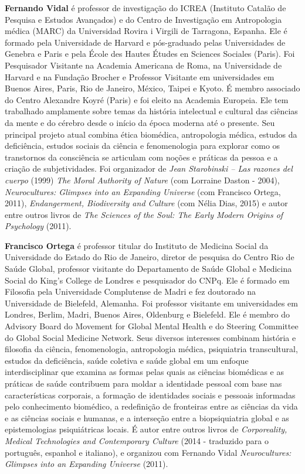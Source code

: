\textbf{Fernando Vidal} é professor de investigação do ICREA (Instituto
Catalão de Pesquisa e Estudos Avançados) e do Centro de Investigação em
Antropologia médica (MARC) da Universidad Rovira i Virgili de Tarragona,
Espanha. Ele é formado pela Universidade de Harvard e pós-graduado pelas
Universidades de Genebra e Paris e pela École des Hautes Études en
Sciences Sociales (Paris). Foi Pesquisador Visitante na Academia
Americana de Roma, na Universidade de Harvard e na Fundação Brocher e
Professor Visitante em universidades em Buenos Aires, Paris, Rio de
Janeiro, México, Taipei e Kyoto. É membro associado do Centro Alexandre
Koyré (Paris) e foi eleito na Academia Europeia. Ele tem trabalhado
amplamente sobre temas da história intelectual e cultural das ciências
da mente e do cérebro desde o início da época moderna até o presente.
Seu principal projeto atual combina ética biomédica, antropologia
médica, estudos da deficiência, estudos sociais da ciência e
fenomenologia para explorar como os transtornos da consciência se
articulam com noções e práticas da pessoa e a criação de subjetividades.
Foi organizador de \emph{Jean Starobinski -- Las razones del cuerpo}
(1999) \emph{The Moral Authority of Nature} (com Lorraine Daston -
2004), \emph{Neurocultures: Glimpses into an Expanding Universe }(com
Francisco Ortega, 2011), \emph{Endangerment, Biodiversity and
Culture} (com Nélia Dias, 2015) e autor entre outros livros de \emph{The
Sciences of the Soul: The Early Modern Origins of Psychology} (2011).

\textbf{Francisco Ortega} é professor titular do Instituto de Medicina
Social da Universidade do Estado do Rio de Janeiro, diretor de pesquisa
do Centro Rio de Saúde Global, professor visitante do Departamento de
Saúde Global e Medicina Social do King's College de Londres e
pesquisador do CNPq. Ele é formado em Filosofia pela Universidade
Complutense de Madri e fez doutorado na Universidade de Bielefeld,
Alemanha. Foi professor visitante em universidades em Londres, Berlim,
Madri, Buenos Aires, Oldenburg e Bielefeld. Ele é membro do Advisory
Board do Movement for Global Mental Health e do Steering Committee do
Global Social Medicine Network. Seus diversos interesses combinam
história e filosofia da ciência, fenomenologia, antropologia médica,
psiquiatria transcultural, estudos da deficiência, saúde coletiva e
saúde global em um enfoque interdisciplinar que examina as formas pelas
quais as ciências biomédicas e as práticas de saúde contribuem para
moldar a identidade pessoal com base nas características corporais, a
formação de identidades sociais e pessoais informadas pelo conhecimento
biomédico, a redefinição de fronteiras entre as ciências da vida e as
ciências sociais e humanas, e a interseção entre a biopsiquiatria global
e as epistemologias psiquiátricas locais. É autor entre outros livros de
\emph{Corporeality, Medical Technologies and Contemporary Culture} (2014
- traduzido para o português, espanhol e italiano), e organizou com
Fernando Vidal \emph{Neurocultures: Glimpses into an Expanding Universe}
(2011).



